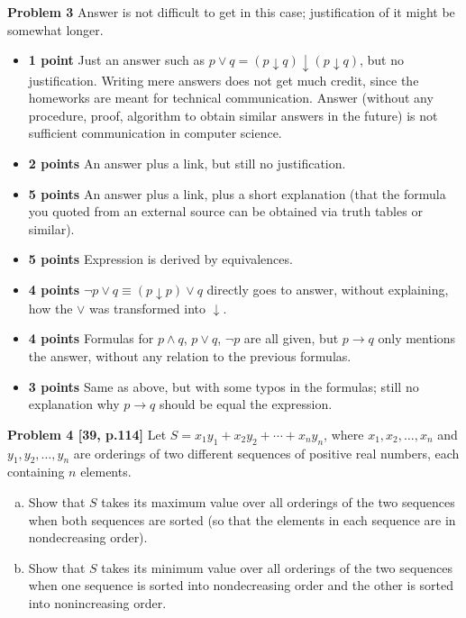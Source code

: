 \documentclass[jou]{apa6}
\begin{document}
\vspace{2ex}
{\bf Problem 3} 
Answer is not difficult to get in this case; justification of it might be somewhat
longer. 
\begin{itemize}
\item {\bf 1 point} Just an answer such as
$p \vee q = (p \downarrow q) \downarrow (p \downarrow q)$, but no justification.
Writing mere answers does not get much credit, since the homeworks
are meant for technical communication. Answer (without any procedure, proof, 
algorithm to obtain similar answers in the future) 
is not sufficient communication in computer science.
\item {\bf 2 points} An answer plus a link, but still no justification. 
\item {\bf 5 points} An answer plus a link, plus a short explanation (that the formula you quoted from 
an external source can be obtained via truth tables or similar). 
\item {\bf 5 points} Expression is derived by equivalences.
\item {\bf 4 points} $\neg p \vee q \equiv (p \downarrow p) \vee q$ directly goes to answer, 
without explaining, how the $\vee$ was transformed into $\downarrow$.
\item {\bf 4 points} Formulas for $p \wedge q$, $p \vee q$, $\neg p$ are all given, 
but $p \rightarrow q$ only mentions the answer, without any relation to the previous formulas.
\item {\bf 3 points} Same as above, but with some typos in the formulas; still no explanation 
why $p \rightarrow q$ should be equal the expression.
\end{itemize}




\vspace{2ex}
{\footnotesize
{\bf Problem 4 [39, p.114]} 
Let $S = x_1y_1 + x_2y_2 + \cdots + x_ny_n$, where $x_1,x_2,\ldots,x_n$
and $y_1,y_2,\ldots,y_n$ are orderings of two different sequences
of positive real numbers, each containing $n$ elements.
\begin{enumerate}[(a)]
\item Show that $S$ takes its maximum value over all orderings of the two 
sequences when both sequences are sorted (so that the elements in each 
sequence are in nondecreasing order). 
\item Show that $S$ takes its minimum value over all orderings of the two 
sequences when one sequence is sorted into nondecreasing order and the other 
is sorted into nonincreasing order.
\end{enumerate}
}
\end{document}
